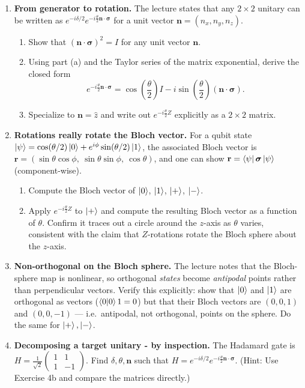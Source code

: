 \documentclass[11pt]{article}
\begin{document}
\begin{enumerate}[label=\textbf{Exercise \arabic*.}, leftmargin=2.2cm]
\item \textbf{From generator to rotation.}
The lecture states that any $2\times2$ unitary can be written as
$e^{-i\delta/2} e^{-i\frac\theta2 \mathbf n\cdot\boldsymbol\sigma}$ for a
unit vector $\mathbf n=(n_x,n_y,n_z)$.
\begin{enumerate}[label=(\alph*)]
\item Show that $(\mathbf n \cdot \boldsymbol\sigma)^2 = I$ for any unit
vector $\mathbf n$.
\item Using part (a) and the Taylor series of the matrix exponential,
derive the closed form
\[
e^{-i\frac\theta2 \mathbf n\cdot\boldsymbol\sigma}
= \cos\!\left(\frac\theta2\right) I
- i\sin\!\left(\frac\theta2\right) (\mathbf n\cdot\boldsymbol\sigma).
\]
\item Specialize to $\mathbf n = \hat z$ and write out
$e^{-i\frac\theta2 Z}$ explicitly as a $2\times2$ matrix.
\end{enumerate}

\item \textbf{Rotations really rotate the Bloch vector.}
For a qubit state $\ket\psi = \cos(\theta/2)\ket0 + e^{i\phi}\sin(\theta/2)\ket1$,
the associated Bloch vector is
$\mathbf r = (\sin\theta\cos\phi,\ \sin\theta\sin\phi,\ \cos\theta)$,
and one can show $\mathbf r = \bra\psi \boldsymbol\sigma \ket\psi$
(component-wise).
\begin{enumerate}[label=(\alph*)]
\item Compute the Bloch vector of $\ket0$, $\ket1$, $\ket+$, $\ket-$.
\item Apply $e^{-i\frac\theta2 Z}$ to $\ket+$ and compute the resulting
Bloch vector as a function of $\theta$. Confirm it traces out a circle
around the $z$-axis as $\theta$ varies, consistent with the claim that
$Z$-rotations rotate the Bloch sphere about the $z$-axis.
\end{enumerate}

\item \textbf{Non-orthogonal on the Bloch sphere.}
The lecture notes that the Bloch-sphere map is nonlinear, so orthogonal
\emph{states} become \emph{antipodal} points rather than
perpendicular vectors. Verify this explicitly: show that $\ket0$ and
$\ket1$ are orthogonal as vectors ($\braket01=0$) but that their Bloch
vectors are $(0,0,1)$ and $(0,0,-1)$ --- i.e.\ antipodal, not orthogonal,
points on the sphere. Do the same for $\ket+,\ket-$.

\item \textbf{Decomposing a target unitary - by inspection.}
The Hadamard gate is $H=\tfrac1{\sqrt2}\begin{pmatrix}1&1\\1&-1\end{pmatrix}$.
Find $\delta,\theta,\mathbf n$ such that
$H = e^{-i\delta/2}e^{-i\frac\theta2\mathbf n\cdot\boldsymbol\sigma}$.
(Hint: Use Exercise 4b and compare the matrices directly.)


\end{enumerate}
\end{document}
